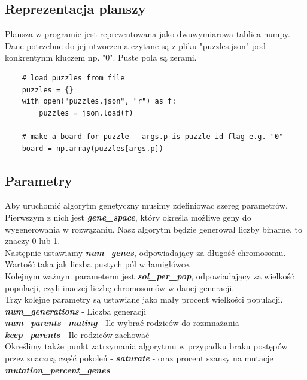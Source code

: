 \documentclass{article}
\begin{document}
\subsection{Reprezentacja planszy}
Plansza w programie jest reprezentowana jako dwuwymiarowa tablica numpy. Dane potrzebne do jej utworzenia czytane są z pliku "puzzles.json" pod konkrentynm kluczem np. "0". Puste pola są zerami.

\begin{verbatim}
    # load puzzles from file
    puzzles = {}
    with open("puzzles.json", "r") as f:
        puzzles = json.load(f)

    # make a board for puzzle - args.p is puzzle id flag e.g. "0"
    board = np.array(puzzles[args.p])
\end{verbatim}

\subsection{Parametry}
Aby uruchomić algorytm genetyczny musimy zdefiniowac szereg parametrów.\\
\newline
Pierwszym z nich jest \textit{\textbf{gene\_space}}, który określa możliwe geny do wygenerowania w rozwązaniu. Nasz algorytm będzie generował liczby binarne, to znaczy 0 lub 1.\\
\newline
Następnie ustawiamy \textit{\textbf{num\_genes}}, odpowiadający za długość chromosomu. Wartość taka jak liczba pustych pól w łamigłówce.\\
\newline
Kolejnym ważnym parameterm jest \textit{\textbf{sol\_per\_pop}}, odpowiadający za wielkość populacji, czyli inaczej liczbę chromosomów w danej generacji.\\
\clearpage
Trzy kolejne parametry są ustawiane jako mały procent wielkości populacji.\\
\textit{\textbf{num\_generations}} \hspace{0.5cm} - Liczba generacji\\
\textit{\textbf{num\_parents\_mating}} - Ile wybrać rodziców do rozmnażania\\
\textit{\textbf{keep\_parents}} \hspace{1.3cm} - Ile rodziców zachować\\
\newline
Określimy także punkt zatrzymania algorytmu w przypadku braku postępów przez znaczną część pokoleń -
\textit{\textbf{saturate}} - oraz procent szansy na mutacje \textit{\textbf{mutation\_percent\_genes}}
\end{document}
